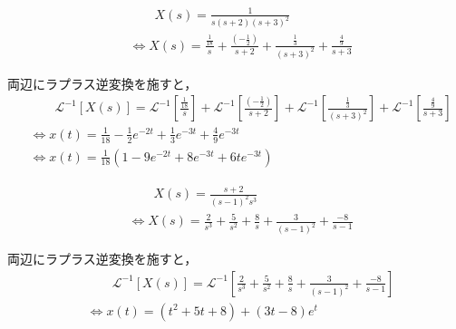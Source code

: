 \documentclass[a4paper,12pt]{article}
\begin{document}
\begin{tcolorbox}[title={ [12] (8) \( X(s)=\frac{ 1 }{ s ( s + 2 ) ( s + 3 )^2 } \) }]
\vspace{-3mm}
\begin{align*}
    &\qquad X(s) =\frac{ 1 }{ s ( s + 2 ) ( s + 3 )^2 }  \\
    &\Leftrightarrow X(s) 
    = \frac{\frac{1}{18}}{s}
    + \frac{(-\frac{1}{2})}{s + 2} 
    + \frac{\frac{1}{3}}{(s + 3)^2} 
    + \frac{\frac{4}{9}}{s + 3} 
\end{align*}

\quad 両辺にラプラス逆変換を施すと，
\vspace{-3mm}
\begin{align*}
    &\qquad \mathcal{L}^{-1} \left[ X(s) \right] 
    =\mathcal{L}^{-1} \left[ \frac{\frac{1}{18}}{s} \right]
    + \mathcal{L}^{-1} \left[ \frac{(-\frac{1}{2})}{s + 2} \right]
    + \mathcal{L}^{-1} \left[ \frac{\frac{1}{3}}{(s + 3)^2} \right]
    + \mathcal{L}^{-1} \left[ \frac{\frac{4}{9}}{s + 3} \right] \\
    &\Leftrightarrow x(t) = \frac{1}{18} - \frac{1}{2}e^{-2t} + \frac{1}{3}e^{-3t} +\frac{4}{9}e^{-3t}\\
    &\Leftrightarrow x(t) =\frac{1}{18} \left(1 - 9e^{-2t} + 8e^{-3t} +6te^{-3t} \right)
\end{align*}
\end{tcolorbox}
\begin{tcolorbox}[title={ [12] (9) \( X(s)=\frac{ s + 2 }{s^3 ( s - 1 )^2 } \) }]
\vspace{-3mm}
\begin{align*}
    &\qquad X(s) =\frac{ s + 2 }{ ( s - 1 )^2 s^3 }  \\
    &\Leftrightarrow X(s) 
    = \frac{2}{s^3}
    + \frac{5}{s^2} 
    + \frac{8}{s}
    + \frac{3}{(s - 1)^2}
    + \frac{-8}{s - 1}
\end{align*}

\quad 両辺にラプラス逆変換を施すと，
\vspace{-3mm}
\begin{align*}
    &\qquad \mathcal{L}^{-1} \left[ X(s) \right] 
    =\mathcal{L}^{-1} \left[
        \frac{2}{s^3}
    + \frac{5}{s^2} 
    + \frac{8}{s}
    + \frac{3}{(s - 1)^2}
    + \frac{-8}{s - 1} \right] \\
    &\Leftrightarrow x(t) = \left(t^2+5t+8\right) + \left(3t-8\right) e^{t}
\end{align*}
\end{tcolorbox}
\end{document}
